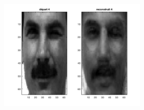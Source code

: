 \documentclass[a4paper]{article}
\begin{document}
\begin{figure}[H]
\begin{subfigure}[c]{0.24\textwidth}
    \end{subfigure}    
    \begin{subfigure}[c]{0.24\textwidth}
        \centering
        \includegraphics[width=0.8\textwidth]{images/ex5_face4.png}
    \end{subfigure}    


\end{figure}
\end{document}
